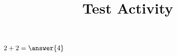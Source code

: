 \documentclass{ximera}
\title{Test Activity}
\begin{document}
\begin{abstract}
\end{abstract}
\maketitle

\begin{problem}
$2 + 2 = \answer{4}$
\end{problem}
\end{document}
